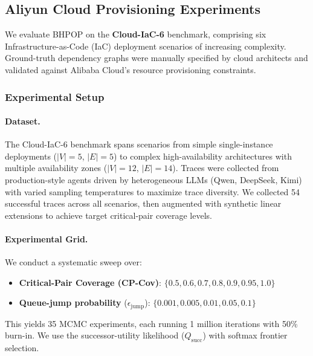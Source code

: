 
\subsection{Aliyun Cloud Provisioning Experiments}
\label{sec:aliyun_experiments}

We evaluate BHPOP on the \textbf{Cloud-IaC-6} benchmark, comprising six Infrastructure-as-Code (IaC) deployment scenarios of increasing complexity. Ground-truth dependency graphs were manually specified by cloud architects and validated against Alibaba Cloud's resource provisioning constraints.

\subsubsection{Experimental Setup}

\paragraph{Dataset.} The Cloud-IaC-6 benchmark spans scenarios from simple single-instance deployments ($|V|=5$, $|E|=5$) to complex high-availability architectures with multiple availability zones ($|V|=12$, $|E|=14$). Traces were collected from production-style agents driven by heterogeneous LLMs (Qwen, DeepSeek, Kimi) with varied sampling temperatures to maximize trace diversity. We collected 54 successful traces across all scenarios, then augmented with synthetic linear extensions to achieve target critical-pair coverage levels.

\paragraph{Experimental Grid.} We conduct a systematic sweep over:
\begin{itemize}[nosep,leftmargin=*]
    \item \textbf{Critical-Pair Coverage (CP-Cov)}: $\{0.5, 0.6, 0.7, 0.8, 0.9, 0.95, 1.0\}$
    \item \textbf{Queue-jump probability} ($\epsilon_{\text{jump}}$): $\{0.001, 0.005, 0.01, 0.05, 0.1\}$
\end{itemize}
This yields 35 MCMC experiments, each running 1 million iterations with 50\% burn-in. We use the successor-utility likelihood ($Q_{\text{succ}}$) with softmax frontier selection.

